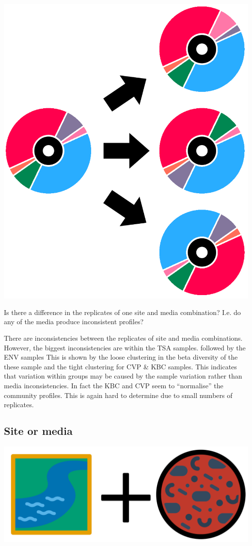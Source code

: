 \documentclass[
]{book}
\begin{document}
\includegraphics{figures/replicate_difference.png}

Is there a difference in the replicates of one site and media combination? I.e. do any of the media produce inconsistent profiles?

There are inconsistencies between the replicates of site and media combinations.
However, the biggest inconsistencies are within the TSA samples. followed by the ENV samples
This is shown by the loose clustering in the beta diversity of the these sample and the tight clustering for CVP \& KBC samples.
This indicates that variation within groups may be caused by the sample variation rather than media inconsistencies.
In fact the KBC and CVP seem to ``normalise'' the community profiles.
This is again hard to determine due to small numbers of replicates.

\hypertarget{site-or-media}{%
\subsection{Site or media}\label{site-or-media}}

\includegraphics{figures/site_and_media.png}
\end{document}
